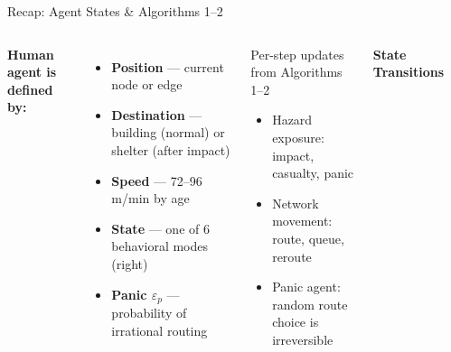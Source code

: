 \documentclass[aspectratio=169, xcolor=table]{beamer}
\newcommand{\parambox}[2]{\textcolor{highlightblue}{\textbf{#1}} {\scriptsize--- #2}}
\begin{document}
\begin{frame}[t]{Recap: Agent States \& Algorithms 1--2}
\footnotesize

\begin{columns}[T,onlytextwidth]
\textbf{Human agent is defined by:}
\vspace{0.2em}
\begin{itemize}\itemsep0.25em
  \item \parambox{Position}{current node or edge}
  \item \parambox{Destination}{building (normal) or shelter (after impact)}
  \item \parambox{Speed}{72--96 m/min by age}
  \item \parambox{State}{one of 6 behavioral modes (right)}
  \item \parambox{Panic $\varepsilon_p$}{probability of irrational routing}
\end{itemize}

\vspace{0.45em}
\begin{block}{\scriptsize Per-step updates from Algorithms 1--2}
\scriptsize
\begin{itemize}\itemsep0.25em
  \item Hazard exposure: impact, casualty, panic
  \item Network movement: route, queue, reroute
  \item Panic agent: random route choice is irreversible
\end{itemize}
\end{block}

\textbf{State Transitions}
\vspace{0.1em}

\begin{center}
\end{center}
\end{columns}
\end{frame}
\end{document}

